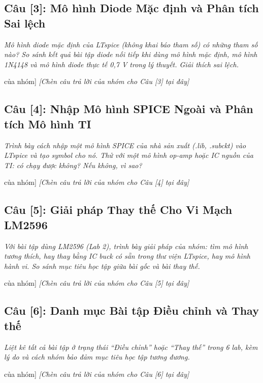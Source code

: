 \documentclass[12pt,a4paper]{report}
\begin{document}
\subsection*{Câu [3]: Mô hình Diode Mặc định và Phân tích Sai lệch}
\textit{\color{guidegray}Mô hình diode mặc định của LTspice (không khai báo tham số) có những tham số nào? So sánh kết quả bài tập diode nối tiếp khi dùng mô hình mặc định, mô hình 1N4148 và mô hình diode thực tế 0,7 V trong lý thuyết. Giải thích sai lệch.}
\begin{orangebox}[Trả lời Câu [3] của nhóm]
\textit{\color{guidegray}[Chèn câu trả lời của nhóm cho Câu [3] tại đây]}
\end{orangebox}

\subsection*{Câu [4]: Nhập Mô hình SPICE Ngoài và Phân tích Mô hình TI}
\textit{\color{guidegray}Trình bày cách nhập một mô hình SPICE của nhà sản xuất (.lib, .subckt) vào LTspice và tạo symbol cho nó. Thử với một mô hình op-amp hoặc IC nguồn của TI: có chạy được không? Nếu không, vì sao?}
\begin{orangebox}[Trả lời Câu [4] của nhóm]
\textit{\color{guidegray}[Chèn câu trả lời của nhóm cho Câu [4] tại đây]}
\end{orangebox}

\subsection*{Câu [5]: Giải pháp Thay thế Cho Vi Mạch LM2596}
\textit{\color{guidegray}Với bài tập dùng LM2596 (Lab 2), trình bày giải pháp của nhóm: tìm mô hình tương thích, hay thay bằng IC buck có sẵn trong thư viện LTspice, hay mô hình hành vi. So sánh mục tiêu học tập giữa bài gốc và bài thay thế.}
\begin{orangebox}[Trả lời Câu [5] của nhóm]
\textit{\color{guidegray}[Chèn câu trả lời của nhóm cho Câu [5] tại đây]}
\end{orangebox}

\subsection*{Câu [6]: Danh mục Bài tập Điều chỉnh và Thay thế}
\textit{\color{guidegray}Liệt kê tất cả bài tập ở trạng thái ``Điều chỉnh'' hoặc ``Thay thế'' trong 6 lab, kèm lý do và cách nhóm bảo đảm mục tiêu học tập tương đương.}
\begin{orangebox}[Trả lời Câu [6] của nhóm]
\textit{\color{guidegray}[Chèn câu trả lời của nhóm cho Câu [6] tại đây]}
\end{orangebox}
\end{document}
